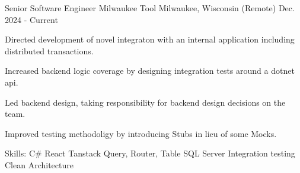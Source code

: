 

\begin{cventries}

\cventry
{Senior Software Engineer} %
{Milwaukee Tool} %
{Milwaukee, Wisconsin (Remote)} %
{Dec. 2024 - Current} %
{
  \begin{cvitems} %
    \item {Directed development of novel integraton with an internal application including distributed transactions.}
    \item {Increased backend logic coverage by designing integration tests around a dotnet api.}
    \item {Led backend design, taking responsibility for backend design decisions on the team.}
    \item {Improved testing methodoligy by introducing Stubs in lieu of some Mocks.}
    \item {Skills: C\# \textbullet{} React \textbullet{} Tanstack Query, Router, Table \textbullet{} SQL Server \textbullet{} Integration testing \textbullet{} Clean Architecture}
  \end{cvitems}
}


\end{cventries}
